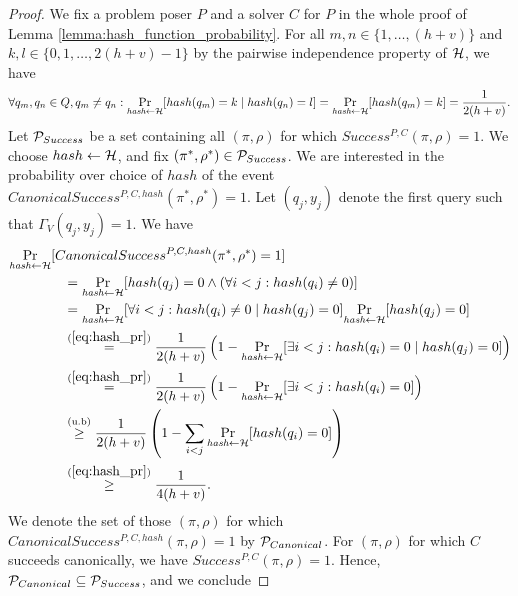 \begin{proof}
We fix a problem poser $P$ and a solver $C$ for $P$ in the whole proof of Lemma \ref{lemma:hash_function_probability}.
For all $m,n \in \{1, \dots, (h+v)\}$ and $k,l \in \{0,1,\dots,2(h+v)-1\}$ by the pairwise independence property of $\mathcal{H}$, we have
\begin{align}
  \label{eq:hash_pr}
 \forall q_m,q_n \in Q, q_m \neq q_n : \underset{\textit{hash} \leftarrow \mathcal{H}}{\Pr}[hash(q_m) = k \mid hash(q_n) = l] =
 \underset{\textit{hash} \leftarrow \mathcal{H}}{\Pr}[hash(q_m) = k] = \frac{1}{2(h+v)}.
\end{align}
%
Let $\mathcal{P}_{Success}$ be a set containing all $(\pi,\rho)$ for which $Success^{P, C}(\pi, \rho) = 1$.
We choose $hash \leftarrow \mathcal{H}$, and fix $(\pi^*, \rho^*) \in \mathcal{P}_{Success}$.
We are interested in the probability over choice of $hash$ of the event $CanonicalSuccess^{P,C,hash}(\pi^*, \rho^*) = 1$.
Let $(q_j, y_j)$ denote the first query such that $\Gamma_V(q_j, y_j) = 1$.
We have
\begin{align}
  \label{ineq:prob_hash_success}
  &\underset{\textit{hash} \leftarrow \mathcal{H}}{\Pr}[CanonicalSuccess^{P,C,hash}(\pi^*, \rho^*) = 1] \notag\\
  &\mbox\qquad\qquad = \underset{\textit{hash} \leftarrow \mathcal{H}}{\Pr}[hash(q_j) = 0 \land (\forall i < j : hash(q_i) \neq 0)] \notag\\
  &\mbox\qquad\qquad = \underset{\textit{hash} \leftarrow \mathcal{H}}{\Pr}[\forall i < j : hash(q_i) \neq 0 \mid hash(q_j) = 0] \underset{\textit{hash} \leftarrow \mathcal{H}}{\Pr}[hash(q_j) = 0] \notag\\
  &\mbox\qquad\qquad \stackrel{(\ref{eq:hash_pr})}{=} \frac{1}{2(h+v)}\left(1 -\underset{\textit{hash} \leftarrow \mathcal{H}}{\Pr}[\exists i < j : hash(q_i) = 0 \mid hash(q_j) = 0] \right) \notag\\
  &\mbox\qquad\qquad \stackrel{(\ref{eq:hash_pr})}{=} \frac{1}{2(h+v)} \left( 1 -\underset{\textit{hash} \leftarrow \mathcal{H}}{\Pr}[\exists i < j : hash(q_i) = 0] \right) \notag\\
  &\mbox\qquad\qquad \stackrel{(\text{u.b})}{\geq} \frac{1}{2(h+v)} \left( 1 - \sum_{i < j} \underset{\textit{hash} \leftarrow \mathcal{H}}{\Pr}[hash(q_i) = 0] \right) \notag\\
  &\mbox\qquad\qquad \stackrel{(\ref{eq:hash_pr})}{\geq} \frac{1}{4(h+v)}.
\end{align}
%
We denote the set of those $(\pi,\rho)$ for which $CanonicalSuccess^{P, C, hash}(\pi, \rho) = 1$ by $\mathcal{P}_{Canonical}$.
For $(\pi, \rho)$ for which $C$ succeeds canonically, we have $Success^{P, C}(\pi, \rho) = 1$.
Hence, $\mathcal{P}_{Canonical} \subseteq \mathcal{P}_{Success}$, and we conclude

\end{proof}

